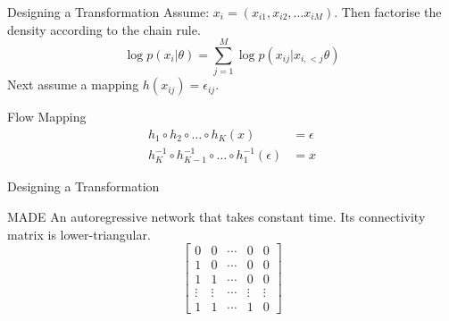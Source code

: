 \documentclass[14pt]{beamer}
\begin{document}
\begin{frame}{Designing a Transformation}
Assume: $ x_{i} = (x_{i1}, x_{i2}, \ldots x_{iM}) $.
Then factorise the density according to the chain rule.
\begin{equation*}
\log p(x_{i}|\theta) = \sum_{j=1}^{M} \log p(x_{ij}|x_{i,<j}\theta)
\end{equation*}
Next assume a mapping $ h(x_{ij}) = \epsilon_{ij} $.
\begin{block}{Flow Mapping}
\begin{equation*}
\begin{aligned}
h_{1}\circ h_{2} \circ\ldots\circ h_{K}(x) &= \epsilon \\
h^{-1}_{K}\circ h^{-1}_{K-1}\circ\ldots \circ h^{-1}_{1}(\epsilon) &= x
\end{aligned}
\end{equation*}
\end{block}
\end{frame}

\begin{frame}{Designing a Transformation}
\begin{block}{MADE \citep{GermainEtAl:2015}}
An autoregressive network that takes constant time. Its connectivity matrix is lower-triangular.
\begin{equation*}
\begin{bmatrix}
0 & 0 & \cdots & 0 & 0 \\
1 & 0 & \cdots & 0 & 0 \\
1 & 1 & \cdots & 0 & 0 \\
\vdots & \vdots & \cdots & \vdots & \vdots \\
1 & 1 & \cdots & 1 & 0
\end{bmatrix}
\end{equation*}
\end{block}
\end{frame}
\end{document}
